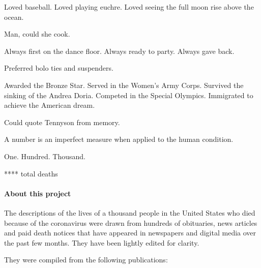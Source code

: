 Loved baseball. Loved playing euchre. Loved seeing the full moon rise
above the ocean.

Man, could she cook.

Always first on the dance floor. Always ready to party. Always gave
back.

Preferred bolo ties and suspenders.

Awarded the Bronze Star. Served in the Women's Army Corps. Survived the
sinking of the Andrea Doria. Competed in the Special Olympics.
Immigrated to achieve the American dream.

Could quote Tennyson from memory.

A number is an imperfect measure when applied to the human condition.

One. Hundred. Thousand.

**** total deaths

\hypertarget{about-this-project}{%
\paragraph{About this project}\label{about-this-project}}

The descriptions of the lives of a thousand people in the United States
who died because of the coronavirus were drawn from hundreds of
obituaries, news articles and paid death notices that have appeared in
newspapers and digital media over the past few months. They have been
lightly edited for clarity.

They were compiled from the following publications:

